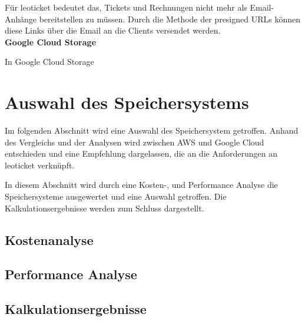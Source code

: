 Für leoticket bedeutet das, Tickets und Rechnungen nicht mehr als Email-Anhänge bereitstellen zu müssen. Durch die Methode der presigned URLs können diese Links über die Email an die Clients versendet werden.\\

\textbf{Google Cloud Storage}

In Google Cloud Storage 

\newpage

\section{Auswahl des Speichersystems}

Im folgenden Abschnitt wird eine Auswahl des Speichersystem getroffen. Anhand des Vergleichs und der Analysen wird zwischen AWS und Google Cloud entschieden und eine Empfehlung dargelassen, die an die Anforderungen an leoticket verknüpft.

In diesem Abschnitt wird durch eine Kosten-, und Performance Analyse die Speichersysteme ausgewertet und eine Auswahl getroffen. Die Kalkulationsergebnisse werden zum Schluss dargestellt.

\subsection{Kostenanalyse}
\subsection{Performance Analyse}
\subsection{Kalkulationsergebnisse}